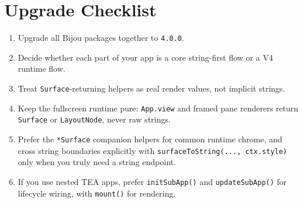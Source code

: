 \section{Upgrade Checklist}\label{record-010-upgrade-checklist}

\begin{enumerate}
\def\labelenumi{\arabic{enumi}.}
\tightlist
\item
  Upgrade all Bijou packages together to \texttt{4\allowbreak{}.\allowbreak{}0\allowbreak{}.\allowbreak{}0}.
\item
  Decide whether each part of your app is a core string-first flow or a V4 runtime flow.
\item
  Treat \texttt{S\allowbreak{}u\allowbreak{}r\allowbreak{}f\allowbreak{}a\allowbreak{}c\allowbreak{}e}-returning helpers as real render values, not implicit strings.
\item
  Keep the fullscreen runtime pure: \texttt{A\allowbreak{}p\allowbreak{}p\allowbreak{}.\allowbreak{}v\allowbreak{}i\allowbreak{}e\allowbreak{}w} and framed pane renderers return \texttt{S\allowbreak{}u\allowbreak{}r\allowbreak{}f\allowbreak{}a\allowbreak{}c\allowbreak{}e} or \texttt{L\allowbreak{}a\allowbreak{}y\allowbreak{}o\allowbreak{}u\allowbreak{}t\allowbreak{}N\allowbreak{}o\allowbreak{}d\allowbreak{}e}, never raw strings.
\item
  Prefer the \texttt{*\allowbreak{}S\allowbreak{}u\allowbreak{}r\allowbreak{}f\allowbreak{}a\allowbreak{}c\allowbreak{}e} companion helpers for common runtime chrome, and cross string boundaries explicitly with \texttt{s\allowbreak{}u\allowbreak{}r\allowbreak{}f\allowbreak{}a\allowbreak{}c\allowbreak{}e\allowbreak{}T\allowbreak{}o\allowbreak{}S\allowbreak{}t\allowbreak{}r\allowbreak{}i\allowbreak{}n\allowbreak{}g\allowbreak{}(\allowbreak{}.\allowbreak{}.\allowbreak{}.\allowbreak{},\allowbreak{} \allowbreak{}c\allowbreak{}t\allowbreak{}x\allowbreak{}.\allowbreak{}s\allowbreak{}t\allowbreak{}y\allowbreak{}l\allowbreak{}e\allowbreak{})} only when you truly need a string endpoint.
\item
  If you use nested TEA apps, prefer \texttt{i\allowbreak{}n\allowbreak{}i\allowbreak{}t\allowbreak{}S\allowbreak{}u\allowbreak{}b\allowbreak{}A\allowbreak{}p\allowbreak{}p\allowbreak{}(\allowbreak{})} and \texttt{u\allowbreak{}p\allowbreak{}d\allowbreak{}a\allowbreak{}t\allowbreak{}e\allowbreak{}S\allowbreak{}u\allowbreak{}b\allowbreak{}A\allowbreak{}p\allowbreak{}p\allowbreak{}(\allowbreak{})} for lifecycle wiring, with \texttt{m\allowbreak{}o\allowbreak{}u\allowbreak{}n\allowbreak{}t\allowbreak{}(\allowbreak{})} for rendering.

\end{enumerate}
